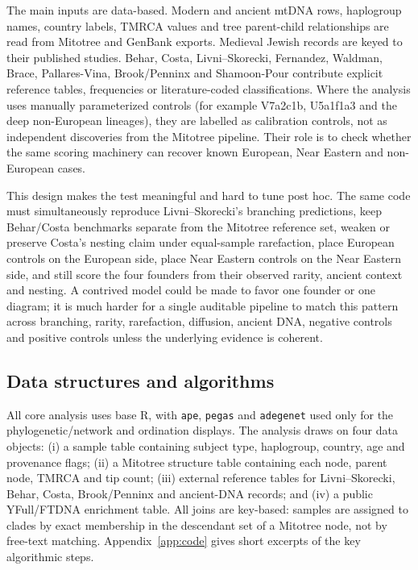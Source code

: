 \documentclass[11pt]{article}
\begin{document}
The main inputs are data-based. Modern and ancient mtDNA rows, haplogroup names, country labels, TMRCA values and tree parent-child relationships are read from Mitotree and GenBank exports. Medieval Jewish records are keyed to their published studies. Behar, Costa, Livni--Skorecki, Fernandez, Waldman, Brace, Pallares-Vina, Brook/Penninx and Shamoon-Pour contribute explicit reference tables, frequencies or literature-coded classifications. Where the analysis uses manually parameterized controls (for example V7a2c1b, U5a1f1a3 and the deep non-European lineages), they are labelled as calibration controls, not as independent discoveries from the Mitotree pipeline. Their role is to check whether the same scoring machinery can recover known European, Near Eastern and non-European cases.

This design makes the test meaningful and hard to tune post hoc. The same code must simultaneously reproduce Livni--Skorecki's branching predictions, keep Behar/Costa benchmarks separate from the Mitotree reference set, weaken or preserve Costa's nesting claim under equal-sample rarefaction, place European controls on the European side, place Near Eastern controls on the Near Eastern side, and still score the four founders from their observed rarity, ancient context and nesting. A contrived model could be made to favor one founder or one diagram; it is much harder for a single auditable pipeline to match this pattern across branching, rarity, rarefaction, diffusion, ancient DNA, negative controls and positive controls unless the underlying evidence is coherent.

\subsection{Data structures and algorithms}
All core analysis uses base R, with \texttt{ape}, \texttt{pegas} and \texttt{adegenet} used only for the phylogenetic/network and ordination displays. The analysis draws on four data objects: (i) a sample table containing subject type, haplogroup, country, age and provenance flags; (ii) a Mitotree structure table containing each node, parent node, TMRCA and tip count; (iii) external reference tables for Livni--Skorecki, Behar, Costa, Brook/Penninx and ancient-DNA records; and (iv) a public YFull/FTDNA enrichment table. All joins are key-based: samples are assigned to clades by exact membership in the descendant set of a Mitotree node, not by free-text matching. Appendix~\ref{app:code} gives short excerpts of the key algorithmic steps.
\end{document}
